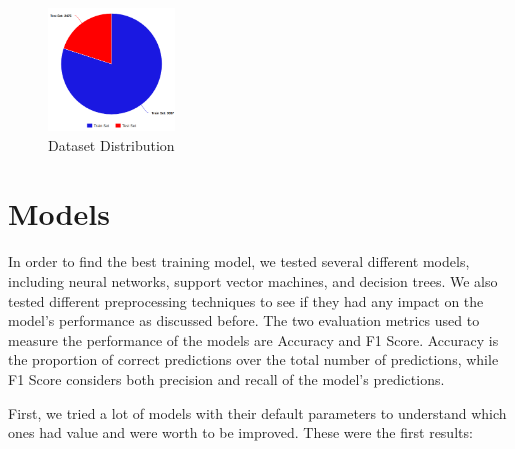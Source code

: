 \documentclass[conference]{IEEEtran}
\begin{document}
\begin{figure}[!h]
    \centering
    \includegraphics[width=0.3\textwidth]{assets/meta-chart.png}
    \caption{Dataset Distribution}
    \label{fig:dataset-dist}
\end{figure}
\section{Models}
In order to find the best training model, we tested several different models, including neural networks, support vector machines, and decision trees. We also tested different preprocessing techniques to see if they had any impact on the model's performance as discussed before.
The two evaluation metrics used to measure the performance of the models are Accuracy and F1 Score. Accuracy is the proportion of correct predictions over the total number of predictions, while F1 Score considers both precision and recall of the model's predictions.

First, we tried a lot of models with their default parameters to understand which ones had value
and were worth to be improved. These were the first results: 
\end{document}

